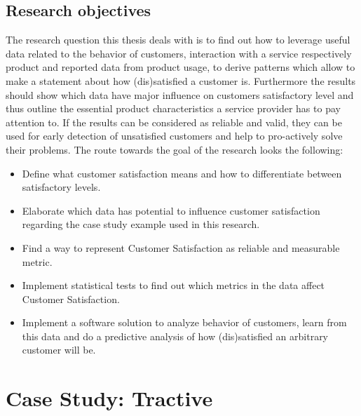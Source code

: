 \subsection{Research objectives}
The research question this thesis deals with is to find out how to leverage useful data related to the behavior of customers, interaction with a service respectively product and reported data from product usage, to derive patterns which allow to make a statement about how (dis)satisfied a customer is. Furthermore the results should show which data have major influence on customers satisfactory level and thus outline the essential product characteristics a service provider has to pay attention to. If the results can be considered as reliable and valid, they can be used for early detection of unsatisfied customers and help to pro-actively solve their problems. 
The route towards the goal of the research looks the following:
\begin{itemize}
	\item Define what customer satisfaction means and how to differentiate between satisfactory levels.
	\item Elaborate which data has potential to influence customer satisfaction regarding the case study example used in this research. 
	\item Find a way to represent Customer Satisfaction as reliable and measurable metric.
	\item Implement statistical tests to find out which metrics in the data affect Customer Satisfaction. 
	\item Implement a software solution to analyze behavior of customers, learn from this data and do a predictive analysis of how (dis)satisfied an arbitrary customer will be.
\end{itemize}

\section{Case Study: Tractive}
\label{sec:illustrationExample}

